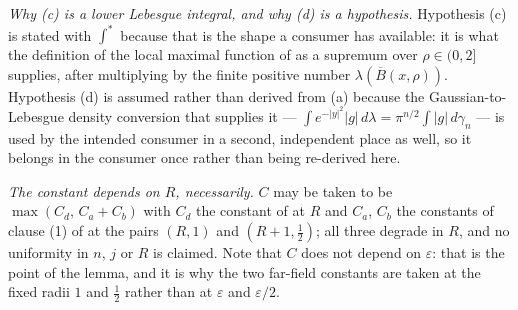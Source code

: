 \begin{lemma}
\emph{Why (c) is a lower Lebesgue integral, and why (d) is a hypothesis.}
Hypothesis (c) is stated with $\int^{*}$ because that is the shape a consumer
has available: it is what the definition of the local maximal function of
 as a supremum over $\rho \in (0,2]$ supplies,
after multiplying by the finite positive number
$\lambda(\overline B(x,\rho))$.  Hypothesis (d) is assumed rather than derived
from (a) because the Gaussian-to-Lebesgue density conversion that supplies it
--- $\int e^{-|y|^2}|g|\,d\lambda = \pi^{n/2}\int|g|\,d\gamma_n$ --- is used by
the intended consumer in a second, independent place as well, so it belongs in
the consumer once rather than being re-derived here.

\emph{The constant depends on $R$, necessarily.}  $C$ may be taken to be
$\max(C_d,\,C_a+C_b)$ with $C_d$ the constant of
 at $R$ and $C_a$, $C_b$ the
constants of clause (1) of  at the pairs
$(R,1)$ and $(R+1,\tfrac12)$; all three degrade in $R$, and no uniformity in
$n$, $j$ or $R$ is claimed.  Note that $C$ does not depend on $\varepsilon$:
that is the point of the lemma, and it is why the two far-field constants are
taken at the fixed radii $1$ and $\tfrac12$ rather than at $\varepsilon$ and
$\varepsilon/2$.
\end{lemma}
